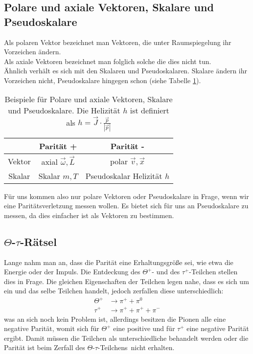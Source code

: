 \documentclass[twoside,colorback,accentcolor=tud4c,11pt]{tudreport}
\begin{document}
\subsection{Polare und axiale Vektoren, Skalare und Pseudoskalare}
Als polaren Vektor bezeichnet man Vektoren, die unter Raumspiegelung ihr Vorzeichen ändern.\\
Als axiale Vektoren bezeichnet man folglich solche die dies nicht tun.\\
Ähnlich verhält es sich mit den Skalaren und Pseudoskalaren. Skalare ändern ihr Vorzeichen nicht, Pseudoskalare hingegen schon (siehe Tabelle \ref{tab:polar}).
\begin{table}[H]
\centering
\begin{tabular}{|c|c|c|}
\hline 
 & Parität + & Parität - \\ 
\hline 
Vektor & \shortstack{axial\\$\vec{\omega},\vec{L}$} & \shortstack{polar \\$\vec{v},\vec{x}$} \\ 
\hline 
Skalar & \shortstack{Skalar \\$m,T$} & \shortstack{Pseudoskalar\\Helizität $h$} \\ 
\hline 
\end{tabular} 
\caption{Beispiele für Polare und axiale Vektoren, Skalare und Pseudoskalare. Die Helizität $h$ ist definiert als $h=\vec{J}\cdot\frac{\vec{p}}{|\vec{p}|}$}\label{tab:polar}
\end{table}
Für uns kommen also nur polare Vektoren oder Pseudoskalare in Frage, wenn wir eine Paritätsverletzung messen wollen. Es bietet sich für uns an Pseudoskalare zu messen, da dies einfacher ist als Vektoren zu bestimmen.
\subsection{$\Theta$-$\tau$-Rätsel}
Lange nahm man an, dass die Parität eine Erhaltungsgröße sei, wie etwa die Energie oder der Impuls. Die Entdeckung des $ \Theta^+ $- und des $ \tau^+ $-Teilchen stellen dies in Frage. Die gleichen Eigenschaften der Teilchen legen nahe, dass es sich um ein und das selbe Teilchen handelt, jedoch zerfallen diese unterschiedlich:
\begin{align}
\Theta^+&\rightarrow\pi^++\pi^0\\
\tau^+&\rightarrow\pi^++\pi^++\pi^-
\end{align}
was an sich noch kein Problem ist, allerdings besitzen die Pionen alle eine negative Parität, womit sich für $\Theta^+$ eine positive und für $\tau^+$ eine negative Parität ergibt. Damit müssen die Teilchen als unterschiedliche behandelt werden oder die Parität ist beim Zerfall des \glqq $\Theta$-$\tau$-Teilchens\grqq\, nicht erhalten.
\end{document}
